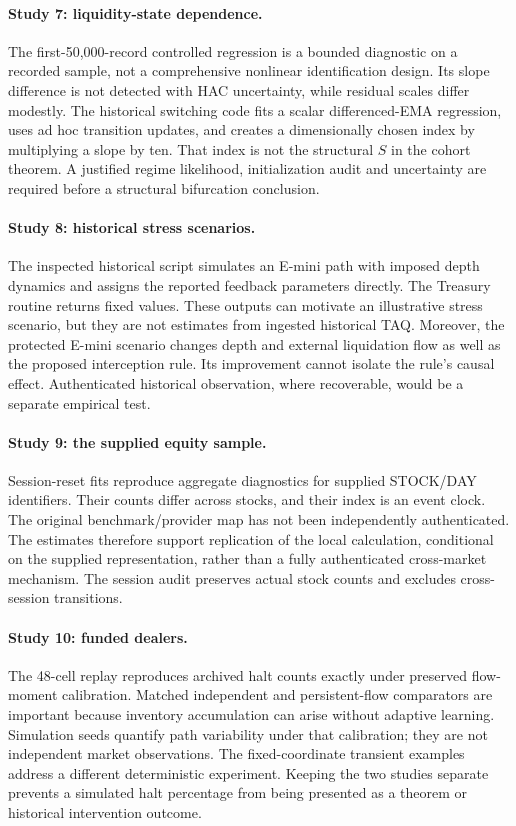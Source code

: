 \paragraph{Study 7: liquidity-state dependence.}
The first-50,000-record controlled regression is a bounded diagnostic on a recorded sample, not a comprehensive nonlinear identification design. Its slope difference is not detected with HAC uncertainty, while residual scales differ modestly. The historical switching code fits a scalar differenced-EMA regression, uses ad hoc transition updates, and creates a dimensionally chosen index by multiplying a slope by ten. That index is not the structural $S$ in the cohort theorem. A justified regime likelihood, initialization audit and uncertainty are required before a structural bifurcation conclusion.

\paragraph{Study 8: historical stress scenarios.}
The inspected historical script simulates an E-mini path with imposed depth dynamics and assigns the reported feedback parameters directly. The Treasury routine returns fixed values. These outputs can motivate an illustrative stress scenario, but they are not estimates from ingested historical TAQ. Moreover, the protected E-mini scenario changes depth and external liquidation flow as well as the proposed interception rule. Its improvement cannot isolate the rule's causal effect. Authenticated historical observation, where recoverable, would be a separate empirical test.

\paragraph{Study 9: the supplied equity sample.}
Session-reset fits reproduce aggregate diagnostics for supplied STOCK/DAY identifiers. Their counts differ across stocks, and their index is an event clock. The original benchmark/provider map has not been independently authenticated. The estimates therefore support replication of the local calculation, conditional on the supplied representation, rather than a fully authenticated cross-market mechanism. The session audit preserves actual stock counts and excludes cross-session transitions.

\paragraph{Study 10: funded dealers.}
The 48-cell replay reproduces archived halt counts exactly under preserved flow-moment calibration. Matched independent and persistent-flow comparators are important because inventory accumulation can arise without adaptive learning. Simulation seeds quantify path variability under that calibration; they are not independent market observations. The fixed-coordinate transient examples address a different deterministic experiment. Keeping the two studies separate prevents a simulated halt percentage from being presented as a theorem or historical intervention outcome.


